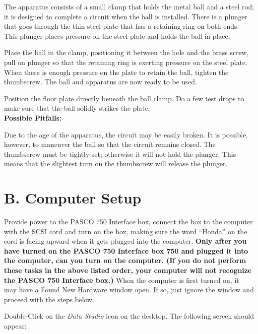   The apparatus consists of a small clamp that holds the metal ball and a steel rod;
it is designed to complete a circuit when the ball is installed. There is a plunger
that goes through the thin steel plate that has a retaining ring on both ends.
This plunger places pressure on the steel plate and holds the ball in place.

  Place the ball in the clamp, positioning it between the hole and the brass screw, pull on
plunger so that the retaining ring is exerting pressure on the steel plate. When there is enough
pressure on the plate to retain the ball, tighten the thumbscrew. The ball and apparatus are now
ready to be used.

  Position the floor plate directly beneath the ball clamp. Do a few test drops to make sure
that the ball solidly strikes the plate. \\
\textbf{Possible Pitfalls:}

  Due to the age of the apparatus, the circuit may be easily broken. It is possible, however, to
maneuver the ball so that the circuit remains closed.
  The thumbscrew must be tightly set; otherwise it will not hold the plunger. This means that
the slightest turn on the thumbscrew will release the plunger.

\section{B. Computer Setup}

  Provide power to the PASCO 750 Interface box, connect the box to the computer with the
SCSI cord and turn on the box, making sure the word “Honda” on the cord is facing upward when
it gets plugged into the computer. \textbf{Only after you have turned on the PASCO 750 Interface
box 750 and plugged it into the computer, can you turn on the computer. (If you do not
perform these tasks in the above listed order, your computer will not recognize the PASCO
750 Interface box.)} When the computer is first turned on, it may have a Found New Hardware
window open. If so, just ignore the window and proceed with the steps below.

  Double-Click on the \emph{Data Studio} icon on the desktop. The following screen should appear:



